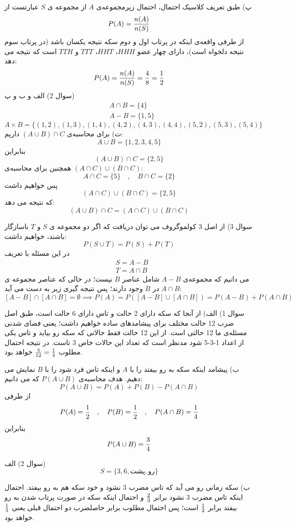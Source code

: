 \documentclass[10pt,letterpaper]{report}
\begin{document}
پ) طبق تعریف کلاسیک احتمال، احتمال زیرمجموعه‌ی $A$ از مجموعه ی $S$ عبارتست از
$$
P(A)={n(A)\over n(S)}
$$
از طرفی واقعه‌ی اینکه در پرتاب اول و دوم سکه نتیجه یکسان باشد (در پرتاب سوم نتیجه دلخواه است)، دارای چهار عضو $HHH$، $HHT$، $TTT$ و $TTH$ است که نتیجه می دهد:
$$
P(A)={n(A)\over n(S)}={4\over8}={1\over2}
$$
سوال 2) الف و ب و پ)
\[
\begin{split}
&A\cap B=\{4\}
\\&A-B=\{1,5\}
\end{split}
\]
$$
A\times B=\{(1,2),(1,3),(1,4),(4,2),(4,3),(4,4),(5,2),(5,3),(5,4)\}
$$
ت) برای محاسبه‌ی 
$
(A\cup B)\cap C
$
داریم:
$$
A\cup B=\{1,2,3,4,5\}
$$
بنابراین
$$
(A\cup B)\cap C=\{2,5\}
$$
همچنین برای محاسبه‌ی $(A\cap C)\cup (B\cap C)$:
$$
A\cap C=\{5\}\quad,\quad B\cap C=\{2\}
$$
پس خواهیم داشت
$$
(A\cap C)\cup(B\cap C)=\{2,5\}
$$
که نتیجه می دهد:
$$
(A\cup B)\cap C=(A\cap C)\cup (B\cap C)
$$

سوال 3) از اصل 3 کولموگروف می توان دریافت که اگر دو مجموعه ی $S$ و $T$ ناسازگار باشند، خواهیم داشت:
$$
P(S\cup T)=P(S)+P(T)
$$
در این مسئله با تعریف
\[
\begin{split}
&S=A-B
\\&T=A\cap B
\end{split}
\]
می دانیم که مجموعه‌ی $A-B$ شامل عناصر $B$ نیست؛ در حالی که عناصر مجموعه ی $A\cap B$ در $B$ وجود دارند؛ پس نتیجه گیری زیر به دست می آید:
$$
[A-B]\cap[A\cap B]=\emptyset\implies P(A)=P([A-B]\cup[A\cap B])=P(A-B)+P(A\cap B)
$$



سوال 1) الف) از آنجا که سکه دارای 2 حالت و تاس دارای 6 حالت است، طبق اصل ضرب 12 حالت مختلف برای پیشامدهای ساده خواهیم داشت؛ یعنی فضای شدنی مسئله‌ی ما 12 حالتی است. از این 12 حالت فقط حالاتی که سکه رو بیاید و تاس یکی از اعداد 1-3-5 شود مدنظر است که تعداد این حالات خاص 3 تاست. در نتیجه احتمال مطلوب 
$
{3\over 12}={1\over 4}
$
خواهد بود.

ب) پیشامد اینکه سکه به رو بیفتد را با $A$ و اینکه تاس فرد شود را با $B$ نمایش می دهیم. هدف محاسبه‌ی 
$
P(A\cup B)
$
 که می دانیم:
$$
P(A\cup B)=P(A)+P(B)-P(A\cap B)
$$
از طرفی
$$
P(A)={1\over 2}\quad,\quad P(B)={1\over 2}\quad,\quad P(A\cap B)={1\over 4}
$$
بنابراین
$$
P(A\cup B)={3\over 4}
$$

سوال 2) الف)
$$
S=\{3,6,\text{پشت},\text{رو}\}
$$

ب) سکه زمانی رو می آید که تاس مضرب 3 نشود و خود سکه هم به رو بیفتد. احتمال اینکه تاس مضرب 3 نشود برابر $2\over 3$ و احتمال اینکه سکه در صورت پرتاب شدن به رو بیفتد برابر $1\over 2$ است؛ پس احتمال مطلوب برابر حاصلضرب دو احتمال قبلی یعنی $1\over 3$ خواهد بود.
\end{document}
